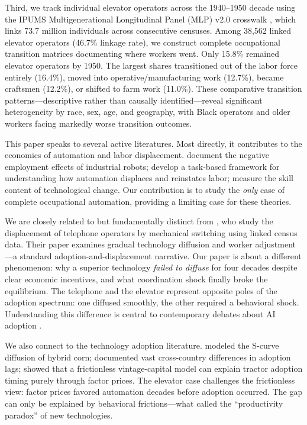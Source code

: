 \documentclass[12pt]{article}
\begin{document}
Third, we track individual elevator operators across the 1940--1950 decade using the IPUMS Multigenerational Longitudinal Panel (MLP) v2.0 crosswalk \citep{ruggles2021}, which links 73.7 million individuals across consecutive censuses. Among 38,562 linked elevator operators (46.7\% linkage rate), we construct complete occupational transition matrices documenting where workers went. Only 15.8\% remained elevator operators by 1950. The largest shares transitioned out of the labor force entirely (16.4\%), moved into operative/manufacturing work (12.7\%), became craftsmen (12.2\%), or shifted to farm work (11.0\%). These comparative transition patterns---descriptive rather than causally identified---reveal significant heterogeneity by race, sex, age, and geography, with Black operators and older workers facing markedly worse transition outcomes.

This paper speaks to several active literatures. Most directly, it contributes to the economics of automation and labor displacement. \citet{acemoglu2020} document the negative employment effects of industrial robots; \citet{acemoglu2019} develop a task-based framework for understanding how automation displaces and reinstates labor; \citet{autor2003} measure the skill content of technological change. Our contribution is to study the \textit{only} case of complete occupational automation, providing a limiting case for these theories.

We are closely related to but fundamentally distinct from \citet{feigenbaum2024}, who study the displacement of telephone operators by mechanical switching using linked census data. Their paper examines gradual technology diffusion and worker adjustment---a standard adoption-and-displacement narrative. Our paper is about a different phenomenon: why a superior technology \textit{failed to diffuse} for four decades despite clear economic incentives, and what coordination shock finally broke the equilibrium. The telephone and the elevator represent opposite poles of the adoption spectrum: one diffused smoothly, the other required a behavioral shock. Understanding this difference is central to contemporary debates about AI adoption \citep{brynjolfsson2017, autor2024, noy2023}.

We also connect to the technology adoption literature. \citet{griliches1957} modeled the S-curve diffusion of hybrid corn; \citet{comin2010} documented vast cross-country differences in adoption lags; \citet{manuelli2014} showed that a frictionless vintage-capital model can explain tractor adoption timing purely through factor prices. The elevator case challenges the frictionless view: factor prices favored automation decades before adoption occurred. The gap can only be explained by behavioral frictions---what \citet{david1990} called the ``productivity paradox'' of new technologies.
\end{document}
